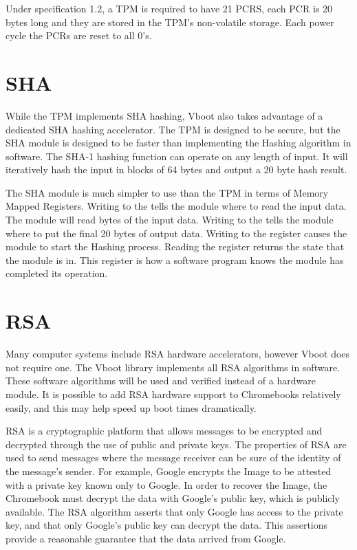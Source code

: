Under specification 1.2, a TPM is required to have 21 PCRS, each PCR is 20 bytes
long and they are stored in the TPM's non-volatile storage.
Each power cycle the PCRs are reset to all 0's.


\section{SHA}

While the TPM implements SHA hashing, Vboot also takes advantage of a dedicated
SHA hashing accelerator. 
The TPM is designed to be secure, but the SHA module is designed to be faster
than implementing the Hashing algorithm in software.
The SHA-1 hashing function can operate on any length of input.
It will iteratively hash the input in blocks of 64 bytes and output a 20 byte
hash result.


The SHA module is much simpler to use than the TPM in terms of Memory Mapped
Registers. 
Writing to the  tells the module where to read the input data.
The module will read  bytes of the input data.
Writing to the  tells the module where to put the final 20
bytes of output data.
Writing to the   register causes the module to start the
Hashing process.
Reading the  register returns the state that the module is in.
This register is how a software program knows the module has completed its
operation.

\section{RSA}

Many computer systems include RSA hardware accelerators, however Vboot does not
require one. 
The Vboot library implements all RSA algorithms in software.
These software algorithms will be used and verified instead of a hardware
module.
It is possible to add RSA hardware support to Chromebooks relatively 
easily, and this may help speed up boot times dramatically.

RSA is a cryptographic platform that allows messages to be encrypted and
decrypted through the use of public and private keys.
The properties of RSA are used to send messages where the message 
receiver can be sure of the identity of the message's sender. 
For example, Google encrypts the Image to be attested with a private key known only to Google.
In order to recover the Image, the Chromebook must decrypt the data with Google's public key, which is publicly available. 
The RSA algorithm asserts that only Google has access to the private 
key, and that only Google's public key can decrypt the data.
This assertions provide a reasonable guarantee that the data arrived from Google.


